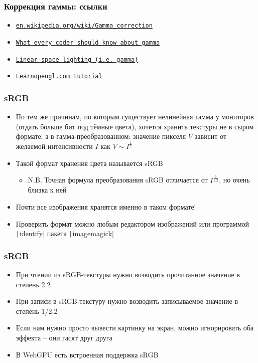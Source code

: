 \documentclass[10pt]{beamer}
\begin{document}
\begin{frame}[fragile]
\frametitle{Коррекция гаммы: ссылки}
\begin{itemize}
\item \href{https://en.wikipedia.org/wiki/Gamma_correction}{\texttt{en.wikipedia.org/wiki/Gamma\_correction}}
\item \href{http://blog.johnnovak.net/2016/09/21/what-every-coder-should-know-about-gamma}{\texttt{What every coder should know about gamma}}
\item \href{http://filmicworlds.com/blog/linear-space-lighting-i-e-gamma}{\texttt{Linear-space lighting (i.e. gamma)}}
\item \href{https://learnopengl.com/Advanced-Lighting/Gamma-Correction}{\texttt{Learnopengl.com tutorial}}
\end{itemize}
\end{frame}

\begin{frame}[fragile]
\frametitle{sRGB}
\begin{itemize}
\item По тем же причинам, по которым существует нелинейная гамма у мониторов (отдать больше бит под тёмные цвета), хочется хранить текстуры не в сыром формате, а в гамма-преобразованном: значение пикселя \begin{math}V\end{math} зависит от желаемой интенсивности \begin{math}I\end{math} как \begin{math}V \sim I^\frac{1}{\gamma}\end{math}
\pause
\item Такой формат хранения цвета называется sRGB
\begin{itemize}
\item N.B. Точная формула преобразования sRGB отличается от \begin{math}I^\frac{1}{2.2}\end{math}, но очень близка к ней
\end{itemize}
\pause
\item Почти все изображения хранятся именно в таком формате!
\pause
\item Проверить формат можно любым редактором изображений или программой \texttt|identify| пакета \texttt|imagemagick|
\end{itemize}
\end{frame}

\begin{frame}[fragile]
\frametitle{sRGB}
\begin{itemize}
\item При чтении из sRGB-текстуры нужно возводить прочитанное значение в степень 2.2
\pause
\item При записи в sRGB-текстуру нужно возводить записываемое значение в степень 1/2.2
\pause
\item Если нам нужно просто вывести картинку на экран, можно игнорировать оба эффекта -- они гасят друг друга
\pause
\item В WebGPU есть встроенная поддержка sRGB
\end{itemize}
\end{frame}
\end{document}

